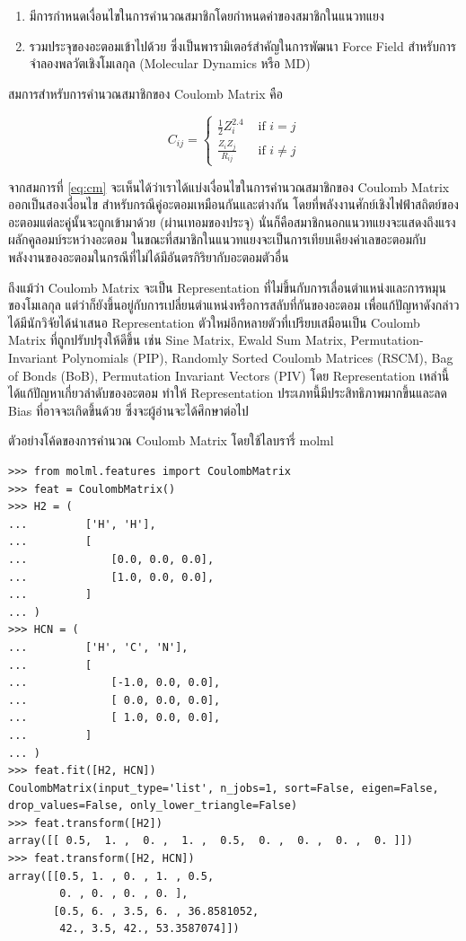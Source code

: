 \begin{enumerate}[topsep=0pt]
    \item มีการกำหนดเงื่อนไขในการคำนวณสมาชิกโดยกำหนดค่าของสมาชิกในแนวทแยง

    \item รวมประจุของอะตอมเข้าไปด้วย ซึ่งเป็นพารามิเตอร์สำคัญในการพัฒนา Force Field สำหรับการจำลองพลวัตเชิงโมเลกุล (Molecular Dynamics หรือ MD)
\end{enumerate}

สมการสำหรับการคำนวณสมาชิกของ Coulomb Matrix คือ

\begin{equation}\label{eq:cm}
    C_{ij} =
    \begin{cases}
        \frac{1}{2} Z_i^{2.4}  & \text{ if } i = j    \\
        \frac{Z_i Z_j}{R_{ij}} & \text{ if } i \neq j
    \end{cases}
\end{equation}

จากสมการที่ \eqref{eq:cm} จะเห็นได้ว่าเราได้แบ่งเงื่อนไขในการคำนวณสมาชิกของ Coulomb Matrix ออกเป็นสองเงื่อนไข สำหรับกรณีคู่อะตอมเหมือนกันและต่างกัน โดยที่พลังงานศักย์เชิงไฟฟ้าสถิตย์ของอะตอมแต่ละคู่นั้นจะถูกเข้ามาด้วย (ผ่านเทอมของประจุ) นั่นก็คือสมาชิกนอกแนวทแยงจะแสดงถึงแรงผลักคูลอมบ์ระหว่างอะตอม ในขณะที่สมาชิกในแนวทแยงจะเป็นการเทียบเคียงค่าเลขอะตอมกับพลังงานของอะตอมในกรณีที่ไม่ได้มีอันตรกิริยากับอะตอมตัวอื่น

ถึงแม้ว่า Coulomb Matrix จะเป็น Representation ที่ไม่ขึ้นกับการเลื่อนตำแหน่งและการหมุนของโมเลกุล แต่ว่าก็ยังขึ้นอยู่กับการเปลี่ยนตำแหน่งหรือการสลับที่กันของอะตอม เพื่อแก้ปัญหาดังกล่าว ได้มีนักวิจัยได้นำเสนอ Representation ตัวใหม่อีกหลายตัวที่เปรียบเสมือนเป็น Coulomb Matrix ที่ถูกปรับปรุงให้ดีขึ้น เช่น Sine Matrix\autocite{faber2015}, Ewald Sum Matrix\autocite{faber2015}, Permutation-Invariant Polynomials (PIP)\autocite{braams2009}, Randomly Sorted Coulomb Matrices (RSCM)\autocite{hansen2013}, Bag of Bonds (BoB)\autocite{hansen2013}, Permutation Invariant Vectors (PIV)\autocite{gallet2013} โดย Representation เหล่านี้ได้แก้ปัญหาเกี่ยวลำดับของอะตอม ทำให้ Representation ประเภทนี้มีประสิทธิภาพมากขึ้นและลด Bias ที่อาจจะเกิดขึ้นด้วย ซึ่งจะผู้อ่านจะได้ศึกษาต่อไป

ตัวอย่างโค้ดของการคำนวณ Coulomb Matrix โดยใช้ไลบรารี่ molml\autocite{collins2018}

\begin{lstlisting}[style=MyPython]
>>> from molml.features import CoulombMatrix
>>> feat = CoulombMatrix()
>>> H2 = (
...         ['H', 'H'],
...         [
...             [0.0, 0.0, 0.0],
...             [1.0, 0.0, 0.0],
...         ]
... )
>>> HCN = (
...         ['H', 'C', 'N'],
...         [
...             [-1.0, 0.0, 0.0],
...             [ 0.0, 0.0, 0.0],
...             [ 1.0, 0.0, 0.0],
...         ]
... )
>>> feat.fit([H2, HCN])
CoulombMatrix(input_type='list', n_jobs=1, sort=False, eigen=False, drop_values=False, only_lower_triangle=False)
>>> feat.transform([H2])
array([[ 0.5,  1. ,  0. ,  1. ,  0.5,  0. ,  0. ,  0. ,  0. ]])
>>> feat.transform([H2, HCN])
array([[0.5, 1. , 0. , 1. , 0.5,
        0. , 0. , 0. , 0. ],
       [0.5, 6. , 3.5, 6. , 36.8581052,
        42., 3.5, 42., 53.3587074]])
\end{lstlisting}


